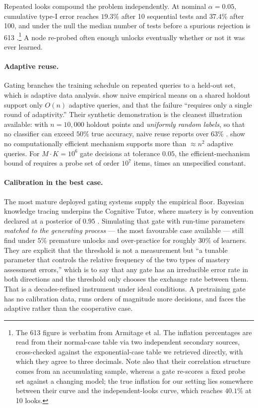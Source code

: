 \documentclass[11pt]{article}
\theoremstyle{plain}
\theoremstyle{definition}
\theoremstyle{remark}
\begin{document}
Repeated looks compound the problem independently. At nominal $\alpha = 0.05$,
cumulative type-I error reaches $19.3\%$ after 10 sequential tests and $37.4\%$
after 100, and under the null the median number of tests before a spurious
rejection is 613 \citep{armitage1969repeated}.\footnote{The 613 figure is
verbatim from Armitage et al. The inflation percentages are read from their
normal-case table via two independent secondary sources, cross-checked against
the exponential-case table we retrieved directly, with which they agree to three
decimals. Note also that their correlation structure comes from an accumulating
sample, whereas a gate re-scores a fixed probe set against a changing model; the
true inflation for our setting lies somewhere between their curve and the
independent-looks curve, which reaches $40.1\%$ at 10 looks.} A node re-probed
often enough unlocks eventually whether or not it was ever learned.

\paragraph{Adaptive reuse.} Gating branches the training schedule on repeated
queries to a held-out set, which is adaptive data analysis.
\citet{dwork2015preserving} show naive empirical means on a shared holdout
support only $O(n)$ adaptive queries, and that the failure ``requires only a
single round of adaptivity.'' Their synthetic demonstration is the cleanest
illustration available: with $n = 10{,}000$ holdout points and \emph{uniformly
random labels}, so that no classifier can exceed $50\%$ true accuracy, naive
reuse reports over $63\%$ \citep{dwork2015reusable}. \citet{steinke2015interactive}
show no computationally efficient mechanism supports more than ${\approx}n^2$
adaptive queries. For $M \cdot K = 10^6$ gate decisions at tolerance $0.05$, the
efficient-mechanism bound of \citet{dwork2015preserving} requires a probe set of
order $10^7$ items, times an unspecified constant.

\paragraph{Calibration in the best case.} The most mature deployed gating systems
supply the empirical floor. Bayesian knowledge tracing
\citep{corbett1995knowledge} underpins the Cognitive Tutor, where mastery is by
convention declared at a posterior of $0.95$ \citep{fancsali2013optimal}.
Simulating that gate with run-time parameters \emph{matched to the generating
process} --- the most favourable case available ---
\citet{fancsali2013optimal} still find under $5\%$ premature unlocks and
over-practice for roughly $30\%$ of learners. They are explicit that the
threshold is not a measurement but ``a tunable parameter that controls the
relative frequency of the two types of mastery assessment errors,'' which is to
say that any gate has an irreducible error rate in both directions and the
threshold only chooses the exchange rate between them. That is a decades-refined
instrument under ideal conditions. A pretraining gate has no calibration data,
runs orders of magnitude more decisions, and faces the adaptive rather than the
cooperative case.
\end{document}
